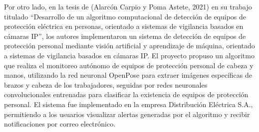 Por otro lado, en la tesis de (Alarcón Carpio y Poma Astete, 2021) \cite{pomadesarrollo} en su trabajo titulado ``Desarrollo de un algoritmo computacional de detección de equipos de protección eléctrica en personas, orientado a sistemas de vigilancia basados en cámaras IP'', los autores implementaron un sistema de detección de equipos de protección personal mediante visión artificial y aprendizaje de máquina, orientado a sistemas de vigilancia basados en cámaras IP. El proyecto propuso un algoritmo que realiza el monitoreo autónomo de equipos de protección personal de cabeza y manos, utilizando la red neuronal OpenPose para extraer imágenes específicas de brazos y cabeza de los trabajadores, seguidas por redes neuronales convolucionales entrenadas para clasificar la existencia de equipos de protección personal. El sistema fue implementado en la empresa Distribución Eléctrica S.A., permitiendo a los usuarios visualizar alertas generadas por el algoritmo y recibir notificaciones por correo electrónico.